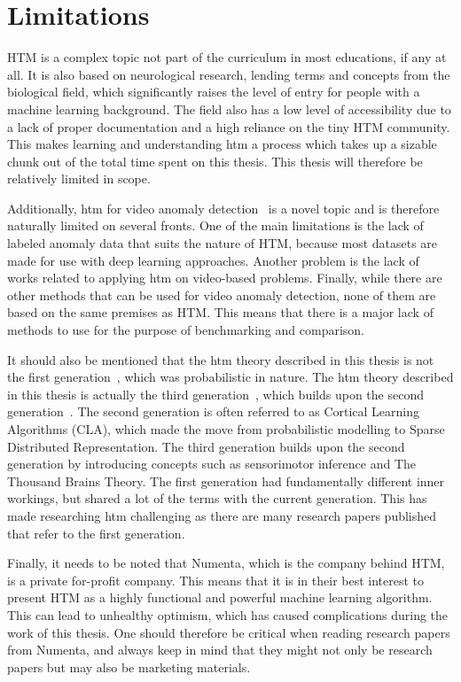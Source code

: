 \section{Limitations}
HTM is a complex topic not part of the curriculum in most educations, if any at all. It is also based on neurological research, lending terms and concepts from the biological field, which significantly raises the level of entry for people with a machine learning background. The field also has a low level of accessibility due to a lack of proper documentation and a high reliance on the tiny HTM community. This makes learning and understanding \gls*{htm} a process which takes up a sizable chunk out of the total time spent on this thesis. This thesis will therefore be relatively limited in scope.
\par
Additionally, \gls*{htm} for video anomaly detection~\cite{MotionAnomalyDetection} is a novel topic and is therefore naturally limited on several fronts. One of the main limitations is the lack of labeled anomaly data that suits the nature of HTM, because most datasets are made for use with deep learning approaches. Another problem is the lack of works related to applying \gls*{htm} on video-based problems. Finally, while there are other methods that can be used for video anomaly detection, none of them are based on the same premises as HTM. This means that there is a major lack of methods to use for the purpose of benchmarking and comparison.
\par
It should also be mentioned that the \gls*{htm} theory described in this thesis is not the first generation~\cite{htm_zeta1}, which was probabilistic in nature. The \gls*{htm} theory described in this thesis is actually the third generation~\cite{htm_gen3, thousandbrains}, which builds upon the second generation~\cite{htm_gen2_sp,htm_gen2_tm}. The second generation is often referred to as Cortical Learning Algorithms (CLA), which made the move from probabilistic modelling to Sparse Distributed Representation. The third generation builds upon the second generation by introducing concepts such as sensorimotor inference and The Thousand Brains Theory. The first generation had fundamentally different inner workings, but shared a lot of the terms with the current generation. This has made researching  \gls*{htm} challenging as there are many research papers published that refer to the first generation.
\par
Finally, it needs to be noted that Numenta, which is the company behind HTM, is a private for-profit company. This means that it is in their best interest to present HTM as a highly functional and powerful machine learning algorithm. This can lead to unhealthy optimism, which has caused complications during the work of this thesis. One should therefore be critical when reading research papers from Numenta, and always keep in mind that they might not only be research papers but may also be marketing materials.

